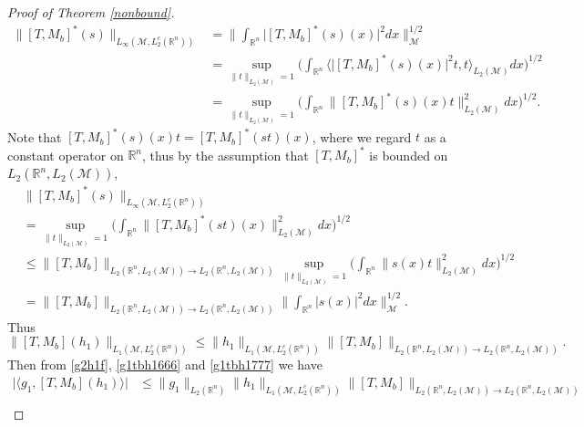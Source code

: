 \documentclass[oneside,english,a4wide]{amsart}
\numberwithin{equation}{section}
\numberwithin{figure}{section}
\theoremstyle{plain}
\theoremstyle{plain}
\theoremstyle{definition}
\theoremstyle{plain}
\theoremstyle{remark}
\theoremstyle{definition}
\theoremstyle{remark}
\theoremstyle{definition}
\newcommand{\8}{\infty}
\begin{document}
\begin{proof}[Proof of Theorem \ref{nonbound}]
    \begin{equation*}
    	\begin{aligned}
    		\|[T,M_b]^*(s)\|_{L_\infty(\mathcal{M},L_2^c(\mathbb{R}^n))}{}&=\bigg\|\int_{\mathbb{R}^n} \big|[T,M_b]^*(s)(x)\big|^2 dx\bigg\|_{\mathcal{M}}^{1/2}\\
    		&=\sup_{\|t\|_{L_2(\mathcal{M})}= 1}\bigg(\int_{\mathbb{R}^n} \Big\langle\big|[T,M_b]^*(s)(x)\big|^2t,t\Big\rangle_{L_2(\mathcal{M})} dx\bigg)^{1/2}\\
    		&=\sup_{\|t\|_{L_2(\mathcal{M})}= 1}\bigg(\int_{\mathbb{R}^n} \big\|[T,M_b]^*(s)(x)t\big\|^2_{L_2(\mathcal{M})} dx\bigg)^{1/2}.
    	\end{aligned}
    \end{equation*}
	Note that $[T,M_b]^*(s)(x)t=[T,M_b]^*(st)(x)$, where we regard $t$ as a constant operator on $\mathbb{R}^n$, thus by the assumption that $[T,M_b]^*$ is bounded on $L_2(\mathbb{R}^n,L_2(\mathcal{M}))$, 
	\begin{equation*}
		\begin{aligned}
			{}&\|[T,M_b]^*(s)\|_{L_\infty(\mathcal{M},L_2^c(\mathbb{R}^n))}{}\\
			&= \sup_{\|t\|_{L_2(\mathcal{M})}= 1}\bigg(\int_{\mathbb{R}^n} \big\|[T,M_b]^*(st)(x)\big\|^2_{L_2(\mathcal{M})} dx\bigg)^{1/2}\\
			&\le \|[T,M_{b}]\|_{L_2(\mathbb{R}^n,L_2(\mathcal{M}))\to L_2(\mathbb{R}^n,L_2(\mathcal{M}))}\sup_{\|t\|_{L_2(\mathcal{M})}= 1}\bigg(\int_{\mathbb{R}^n} \|s(x)t\|^2_{L_2(\mathcal{M})} dx\bigg)^{1/2}\\
			&=\|[T,M_{b}]\|_{L_2(\mathbb{R}^n,L_2(\mathcal{M}))\to L_2(\mathbb{R}^n,L_2(\mathcal{M}))}\bigg\|\int_{\mathbb{R}^n} |s(x)|^2 dx\bigg\|_{\mathcal{M}} ^{1/2}.
		\end{aligned}
	\end{equation*} 
	Thus 
	\begin{equation}\label{g1tbh1777}
		\|[T,M_b](h_1)\|_{L_1(\mathcal{M},L_2^c(\mathbb{R}^n))}\le \|h_1\|_{L_1(\mathcal{M},L_2^c(\mathbb{R}^n))}\|[T,M_{b}]\|_{L_2(\mathbb{R}^n,L_2(\mathcal{M}))\to L_2(\mathbb{R}^n,L_2(\mathcal{M}))}.
	\end{equation}
	Then from \eqref{g2h1f}, \eqref{g1tbh1666} and \eqref{g1tbh1777}  we have
	\begin{equation}\label{bf111}
		\begin{aligned}
			\big|\big\langle g_1,[T,M_b](h_1)\big\rangle\big|{}&\le \|g_1\|_{L_2(\mathbb{R}^n)}\|h_1\|_{L_1(\mathcal{M},L_2^c(\mathbb{R}^n))}\|[T,M_{b}]\|_{L_2(\mathbb{R}^n,L_2(\mathcal{M}))\to L_2(\mathbb{R}^n,L_2(\mathcal{M}))}\\

\end{aligned}
\end{equation}
\end{proof}
\end{document}
